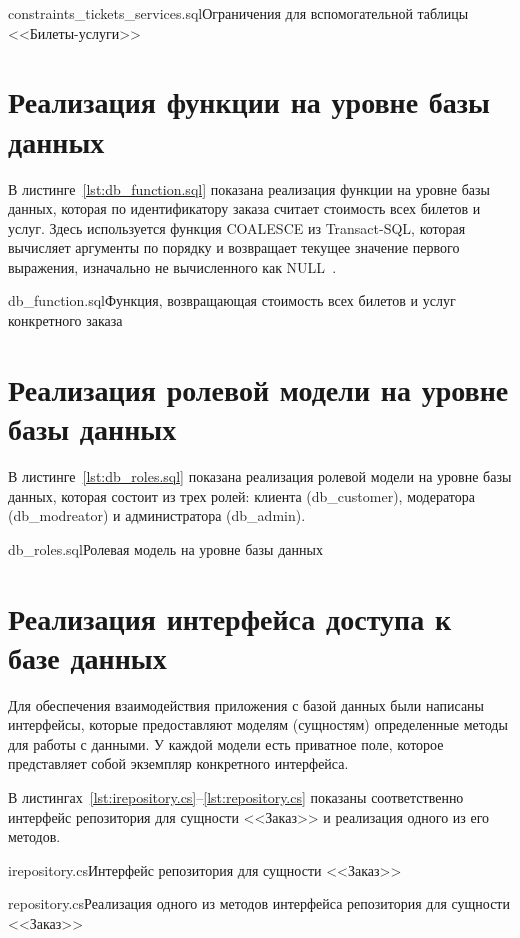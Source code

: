 \documentclass{bmstu}
\begin{document}
{constraints_tickets_services.sql}{Ограничения для вспомогательной таблицы <<Билеты-услуги>>}

\pagebreak
\section{Реализация функции на уровне базы данных}

В листинге~\ref{lst:db_function.sql} показана реализация функции на уровне базы данных, которая по идентификатору заказа считает стоимость всех билетов и услуг. 
Здесь используется функция COALESCE из Transact-SQL, которая вычисляет аргументы по порядку и возвращает текущее значение первого выражения, изначально не вычисленного как \mbox{NULL~\cite{Coalesce}}.

{db_function.sql}{Функция, возвращающая стоимость всех билетов и услуг конкретного заказа}

\pagebreak
\section{Реализация ролевой модели на уровне базы данных}

В листинге~\ref{lst:db_roles.sql} показана реализация ролевой модели на уровне базы данных, которая состоит из трех ролей: клиента (db\_customer), модератора (db\_modreator) и администратора (db\_admin).

{db_roles.sql}{Ролевая модель на уровне базы данных}

\pagebreak
\section{Реализация интерфейса доступа к базе данных}

Для обеспечения взаимодействия приложения с базой данных были написаны интерфейсы, которые предоставляют моделям (сущностям) определенные методы для работы с данными. 
У каждой модели есть приватное поле, которое представляет собой экземпляр конкретного интерфейса.

В листингах~\ref{lst:irepository.cs}--\ref{lst:repository.cs} показаны соответственно интерфейс репозитория для сущности <<Заказ>> и реализация одного из его методов.

{irepository.cs}{Интерфейс репозитория для сущности <<Заказ>>}

{repository.cs}{Реализация одного из методов интерфейса репозитория для сущности <<Заказ>>}
\end{document}

